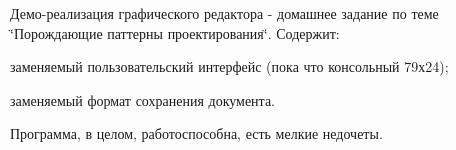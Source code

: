 Демо-\/реализация графического редактора -\/ домашнее задание по теме \char`\"{}Порождающие паттерны проектирования\char`\"{}. Содержит\+:


\begin{DoxyItemize}
\item заменяемый пользовательский интерфейс (пока что консольный 79х24);
\item заменяемый формат сохранения документа.
\end{DoxyItemize}

Программа, в целом, работоспособна, есть мелкие недочеты. 